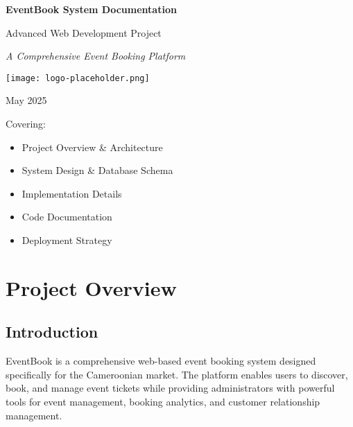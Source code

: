 \documentclass[12pt,a4paper]{article}
\begin{document}
\begin{titlepage}
    \centering
    \vspace*{2cm}
    
    {\huge\bfseries EventBook System Documentation\par}
    \vspace{1cm}
    {\Large Advanced Web Development Project\par}
    \vspace{2cm}
    
    {\large\itshape A Comprehensive Event Booking Platform\par}
    \vspace{1cm}
    
    \texttt{[image: logo-placeholder.png]}
    \vspace{1cm}
    
    {\large May 2025\par}
    
    \vfill
    
    {\large Covering:\par}
    {\normalsize 
    \begin{itemize}[left=2cm]
        \item Project Overview \& Architecture
        \item System Design \& Database Schema
        \item Implementation Details
        \item Code Documentation
        \item Deployment Strategy
    \end{itemize}
    }
    
    \vfill
\end{titlepage}

\newpage
\tableofcontents
\newpage

\section{Project Overview}

\subsection{Introduction}
EventBook is a comprehensive web-based event booking system designed specifically for the Cameroonian market. The platform enables users to discover, book, and manage event tickets while providing administrators with powerful tools for event management, booking analytics, and customer relationship management.
\end{document}
